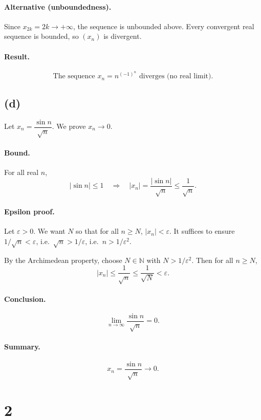 \documentclass[12pt,a4paper]{article}
\theoremstyle{definition}
\theoremstyle{remark}
\begin{document}
\paragraph{Alternative (unboundedness).}
Since $x_{2k}=2k\to +\infty$, the sequence is unbounded above. Every convergent real sequence is bounded, so $(x_n)$ is divergent.

\paragraph{Result.}
\[
\boxed{\text{The sequence } x_n = n^{(-1)^n} \text{ diverges (no real limit).}}
\]

\subsection*{(d)}
Let \(x_n = \dfrac{\sin n}{\sqrt{n}}\). We prove \(x_n \to 0\).

\paragraph{Bound.}
For all real \(n\),
\[
|\sin n| \le 1 \quad \Longrightarrow\quad |x_n| = \frac{|\sin n|}{\sqrt{n}} \le \frac{1}{\sqrt{n}}.
\]

\paragraph{Epsilon proof.}
Let \(\varepsilon>0\). We want \(N\) so that for all \(n\ge N\), \( |x_n| < \varepsilon\).
It suffices to ensure \(1/\sqrt{n} < \varepsilon\), i.e.\ \(\sqrt{n} > 1/\varepsilon\), i.e.\ \(n > 1/\varepsilon^{2}\).

By the Archimedean property, choose \(N\in\mathbb{N}\) with \(N > 1/\varepsilon^{2}\).
Then for all \(n\ge N\),
\[
|x_n| \le \frac{1}{\sqrt{n}} \le \frac{1}{\sqrt{N}} < \varepsilon.
\]

\paragraph{Conclusion.}
\[
\lim_{n\to\infty} \frac{\sin n}{\sqrt{n}} = 0.
\]

\paragraph{Summary.}
\[
\boxed{x_n = \frac{\sin n}{\sqrt{n}} \longrightarrow 0.}
\]

\section*{2}
\end{document}
